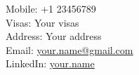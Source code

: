 {\noindent
  \raggedright%
  Mobile: +1 23456789 \\
  Visas: Your visas \\
  Address: Your address \\
  Email: \href{mailto:your.name@gmail.com}{\underline{your.name@gmail.com}}
  \ifcvshort%
  \else%
    \\
    LinkedIn: \href{https://www.linkedin.com/in/your-name/}{\underline{your.name}}
  \fi%
}
